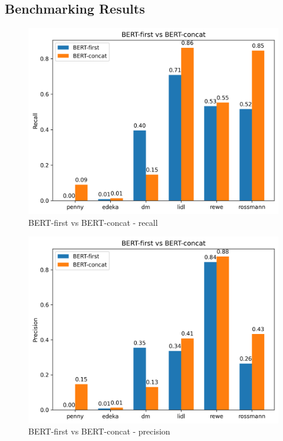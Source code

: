\documentclass[licencjacka,en]{pracamgr}
\begin{document}
\begin{appendices}
\chapter{Benchmarking Results} \label{AppF}
\begin{figure}[h]
    \centering
    \includegraphics[width=0.8\linewidth]{bachelor_images/benchmark/bert_first_vs_concat_recall.png}
    \caption{BERT-first vs BERT-concat - recall}
    \label{fig:bert_first_vs_concat_recall}
\end{figure}

\begin{figure}[h]
    \centering
    \includegraphics[width=0.8\linewidth]{bachelor_images/benchmark/bert_first_vs_concat_precision.png}
    \caption{BERT-first vs BERT-concat - precision}
    \label{fig:bert_first_vs_concat_precision}
\end{figure}


\end{appendices}
\end{document}
